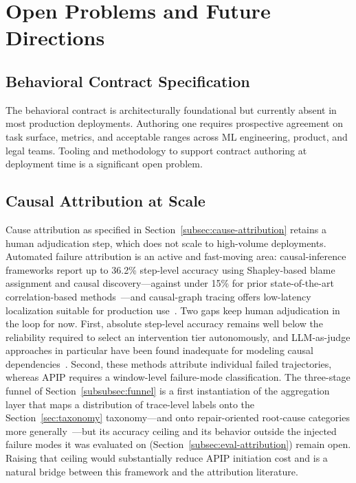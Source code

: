 \section{Open Problems and Future Directions}
\label{sec:open-problems}

\subsection{Behavioral Contract Specification}
\label{subsec:contract-spec}

The behavioral contract is architecturally foundational but currently absent in
most production deployments. Authoring one requires prospective agreement on
task surface, metrics, and acceptable ranges across ML engineering, product,
and legal teams. Tooling and methodology to support contract authoring at
deployment time is a significant open problem.

\subsection{Causal Attribution at Scale}
\label{subsec:attribution-scale}

Cause attribution as specified in Section~\ref{subsec:cause-attribution} retains
a human adjudication step, which does not scale to high-volume deployments.
Automated failure attribution is an active and fast-moving area: causal-inference
frameworks report up to 36.2\% step-level accuracy using Shapley-based blame
assignment and causal discovery---against under 15\% for prior state-of-the-art
correlation-based methods~\cite{ma2025attribution,zhang2025whichagent}---and
causal-graph tracing offers low-latency localization suitable for production
use~\cite{agenttrace2026}. Two gaps keep human adjudication in the loop for now.
First, absolute step-level accuracy remains well below the reliability required
to select an intervention tier autonomously, and LLM-as-judge approaches in
particular have been found inadequate for modeling causal
dependencies~\cite{ma2025attribution}. Second, these methods attribute individual
failed trajectories, whereas APIP requires a window-level failure-mode
classification. The three-stage funnel of Section~\ref{subsubsec:funnel} is a
first instantiation of the aggregation layer that maps a distribution of
trace-level labels onto the Section~\ref{sec:taxonomy} taxonomy---and onto
repair-oriented root-cause categories more
generally~\cite{ma2025lifecycle}---but its accuracy ceiling and its behavior
outside the injected failure modes it was evaluated on
(Section~\ref{subsec:eval-attribution}) remain open. Raising that ceiling
would substantially reduce APIP initiation cost and is a natural bridge
between this framework and the attribution literature.

